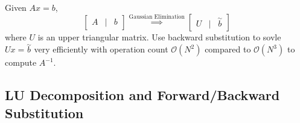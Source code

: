 \documentclass[12pt]{scrartcl}
\begin{document}
\begin{definition}
  Given $Ax = b$, 
  \[\begin{bmatrix}
    A & | & b
  \end{bmatrix} \overset{\text{Gaussian Elimination}}{\implies} \begin{bmatrix}
    U & | & \overset{\sim}{b}
  \end{bmatrix}\]
  where $U$ is an upper triangular matrix. Use backward substitution to sovle $Ux = \overset{\sim}{b}$
  very efficiently with operation count $\mathcal{O}(N^2)$ compared to $\mathcal{O}(N^3)$ to 
  compute $A^{-1}$.  
\end{definition}

\subsection{LU Decomposition and Forward/Backward Substitution}
\end{document}
